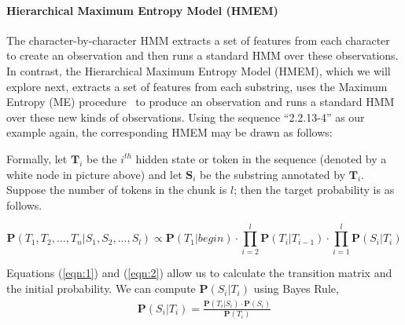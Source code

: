 \paragraph*{Hierarchical Maximum Entropy Model (HMEM)}\label{subsec:hmem}

The character-by-character HMM extracts a set of features from each character
to create an observation and then runs a standard HMM over these observations.
In contrast, the Hierarchical Maximum Entropy Model (HMEM), which we
will explore next, extracts a set of features from each substring, uses
the Maximum Entropy (ME) procedure~\cite{Berger96:ME,megaweb}
to produce an observation and runs a standard HMM over these new kinds
of observations.  
Using the sequence ``2.2.13-4'' as our example again, the corresponding
HMEM may be drawn as follows:

\begin{center}
\end{center}


Formally, let $\mathbf{T}_i$ be the $i^{th}$ hidden state or token in the
sequence (denoted by a white node in picture above) and
let $\mathbf{S}_i$ be the substring annotated by $\mathbf{T}_i$. 
Suppose the number of tokens in the chunk is $l$; then the
target probability is as follows.

\begin{equation}
\mathbf{P}(T_1, T_2, ..., T_n|S_1, S_2, ..., S_l)  \propto
\mathbf{P}(T_1|begin) \cdot \prod_{i=2}^{l}{\mathbf{P}(T_i|T_{i-1})}
\cdot \prod_{i=1}^{l}\mathbf{P}(S_i|T_i)
\end{equation}

Equations (\ref{eqn:1}) and (\ref{eqn:2}) allow us to calculate
the transition matrix and the initial probability.
We can compute $\mathbf{P}(S_i|T_i)$ using Bayes Rule,
\begin{eqnarray} \label{eqn:bayes}
\mathbf{P}(S_i|T_i) = \frac{\mathbf{P}(T_i|S_i) \cdot
\mathbf{P}(S_i)}{\mathbf{P}(T_i)}
\end{eqnarray}


